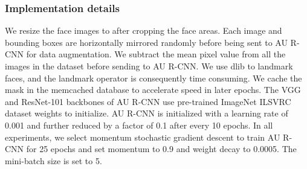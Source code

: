 \documentclass[5p,twocolumn]{elsarticle}
\begin{document}
\subsubsection{Implementation details} 
We resize the face images to  after cropping the face areas. Each image and bounding boxes are horizontally mirrored randomly before being sent to AU R-CNN for data augmentation. We subtract the mean pixel value from all the images in the dataset before sending to AU R-CNN. We use dlib \cite{king2009dlib} to landmark faces, and the landmark operator is consequently time consuming. We cache the mask in the memcached database to accelerate speed in later epochs. The VGG and ResNet-101 backbones of AU R-CNN use pre-trained ImageNet ILSVRC dataset \cite{deng2009imagenet} weights to initialize. AU R-CNN is initialized with a learning rate of 0.001 and further reduced by a factor of 0.1 after every 10 epochs. In all experiments, we select momentum stochastic gradient descent to train AU R-CNN for 25 epochs and set momentum to 0.9 and weight decay to 0.0005. The mini-batch size is set to 5.
\end{document}
